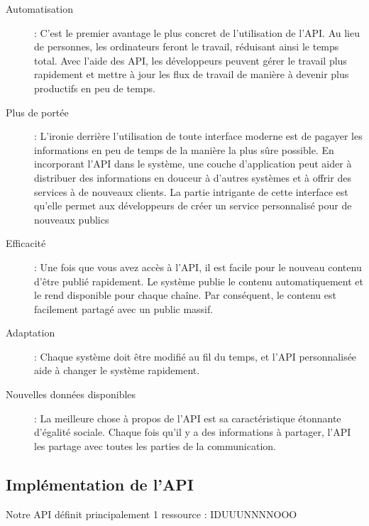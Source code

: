 \begin{description}
    \item [Automatisation]: C'est le premier avantage le plus concret de l'utilisation de l'API. Au lieu de personnes, les ordinateurs feront le travail, réduisant ainsi le temps total. Avec l'aide des API, les développeurs peuvent gérer le travail plus rapidement et mettre à jour les flux de travail de manière à devenir plus productifs en peu de temps.
    \item [Plus de portée]: L'ironie derrière l'utilisation de toute interface moderne est de pagayer les informations en peu de temps de la manière la plus sûre possible. En incorporant l'API dans le système, une couche d'application peut aider à distribuer des informations en douceur à d'autres systèmes et à offrir des services à de nouveaux clients. La partie intrigante de cette interface est qu'elle permet aux développeurs de créer un service personnalisé pour de nouveaux publics
     \item[Efficacité] : Une fois que vous avez accès à l'API, il est facile pour le nouveau contenu d'être publié rapidement. Le système publie le contenu automatiquement et le rend disponible pour chaque chaîne. Par conséquent, le contenu est facilement partagé avec un public massif. 
     \item[Adaptation] : Chaque système doit être modifié au fil du temps, et l'API personnalisée aide à changer le système rapidement.
     \item[Nouvelles données disponibles] : La meilleure chose à propos de l'API est sa caractéristique étonnante d'égalité sociale. Chaque fois qu'il y a des informations à partager, l'API les partage avec toutes les parties de la communication.
\end{description} 



  \subsection{Implémentation de l’API}
  Notre API définit principalement 1 ressource : 
 IDUUUNNNNOOO
